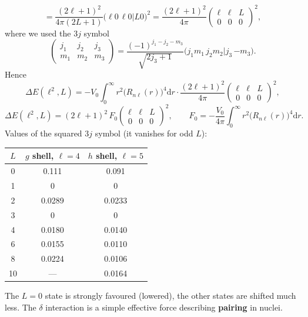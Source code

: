 \documentclass[11pt,a4paper]{article}
\newcommand{\ud}{\mathrm{d}}
\begin{document}
\[
=\frac{(2\ell+1)^2}{4\pi(2L+1)}\big(\ell0\,\ell0\big|L0\big)^2=\frac{(2\ell+1)^2}{4\pi}\begin{pmatrix}\ell&\ell&L\\0&0&0\end{pmatrix}^2,
\]
where we used the 3$j$ symbol
\[
\begin{pmatrix}j_1&j_2&j_3\\m_1&m_2&m_3\end{pmatrix}=\frac{(-1)^{j_1-j_2-m_3}}{\sqrt{2j_3+1}}\big(j_1m_1\,j_2m_2\big|j_3\,{-m_3}\big).
\]
Hence
\[
\Delta E(\ell^2,L)=-V_0\int_0^\infty r^2\big(R_{n\ell}(r)\big)^4\ud r\cdot\frac{(2\ell+1)^2}{4\pi}\begin{pmatrix}\ell&\ell&L\\0&0&0\end{pmatrix}^2,
\]
\[
\boxed{\Delta E(\ell^2,L)=(2\ell+1)^2\,F_0\begin{pmatrix}\ell&\ell&L\\0&0&0\end{pmatrix}^2},
\qquad
F_0=-\frac{V_0}{4\pi}\int_0^\infty r^2\big(R_{n\ell}(r)\big)^4\ud r .
\]
Values of the squared 3$j$ symbol (it vanishes for odd $L$):
\begin{center}
\begin{tabular}{c c c}
$L$ & $g$ shell, $\ell=4$ & $h$ shell, $\ell=5$\\ \hline
0 & 0.111 & 0.091\\
1 & 0 & 0\\
2 & 0.0289 & 0.0233\\
3 & 0 & 0\\
4 & 0.0180 & 0.0140\\
6 & 0.0155 & 0.0110\\
8 & 0.0224 & 0.0106\\
10 & --- & 0.0164
\end{tabular}
\end{center}
The $L=0$ state is strongly favoured (lowered), the other states are shifted much less. The $\delta$ interaction is a simple effective force describing \textbf{pairing} in nuclei.
\end{document}
